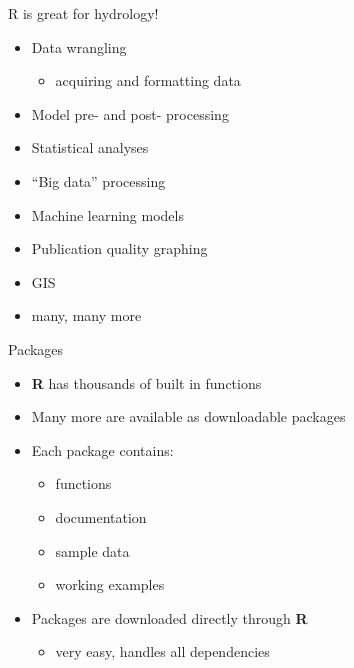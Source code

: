 \documentclass[
  ignorenonframetext,
  aspectratio=169]{beamer}
\providecommand{\tightlist}{%
  \setlength{\itemsep}{0pt}\setlength{\parskip}{0pt}}
\begin{document}
\begin{frame}{R is great for hydrology!}
\protect\hypertarget{r-is-great-for-hydrology}{}
\begin{itemize}
\tightlist
\item
  Data wrangling

  \begin{itemize}
  \tightlist
  \item
    acquiring and formatting data
  \end{itemize}
\item
  Model pre- and post- processing
\item
  Statistical analyses
\item
  ``Big data'' processing
\item
  Machine learning models
\item
  Publication quality graphing
\item
  GIS
\item
  many, many more
\end{itemize}
\end{frame}

\begin{frame}{Packages}
\protect\hypertarget{packages}{}
\begin{itemize}
\tightlist
\item
  \textbf{R} has thousands of built in functions
\item
  Many more are available as downloadable packages
\item
  Each package contains:

  \begin{itemize}
  \tightlist
  \item
    functions
  \item
    documentation
  \item
    sample data
  \item
    working examples
  \end{itemize}
\item
  Packages are downloaded directly through \textbf{R}

  \begin{itemize}
  \tightlist
  \item
    very easy, handles all dependencies
  \end{itemize}
\end{itemize}
\end{frame}
\end{document}
